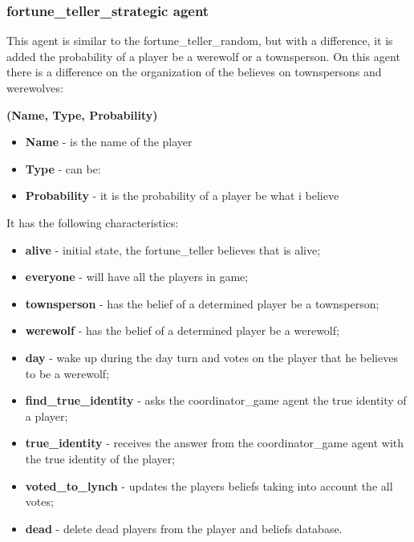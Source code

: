 \documentclass{article}
\begin{document}
\subsubsection{fortune\_teller\_strategic agent}
This agent is similar to the fortune\_teller\_random, but with a difference, it is added the probability of a player be a werewolf or a townsperson.
On this agent there is a difference on the organization of the believes on townspersons and werewolves:
\newline
\centerline{\textbf{(Name, Type, Probability)}}
\begin{itemize}
	\item \textbf{Name} - is the name of the player
	\item \textbf{Type} - can be:
	\item \textbf{Probability} - it is the probability of a player be what i believe
\end{itemize}
													
It has the following characteristics:
\begin{itemize}
	\item \textbf{alive} - initial state, the fortune\_teller believes that is alive;
	\item \textbf{everyone} - will have all the players in game;
	\item \textbf{townsperson} - has the belief of a determined player be a townsperson;
	\item \textbf{werewolf} - has the belief of a determined player be a werewolf;
	\item \textbf{day} - wake up during the day turn and votes on the player that he believes to be a werewolf;
	\item \textbf{find\_true\_identity} - asks the coordinator\_game agent the true identity of a player;
	\item \textbf{true\_identity} - receives the answer from the coordinator\_game agent with the true identity of the player;
	\item \textbf{voted\_to\_lynch} - updates the players beliefs taking into account the all votes;
	\item \textbf{dead} - delete dead players from the player and beliefs database.
\end{itemize}  
\end{document}

